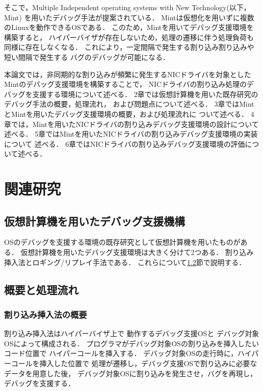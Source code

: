 \documentclass[tanilab-enum]{graduate}
\begin{document}
そこで，Multiple Independent operating systems with New Technology(以下，Mint)\cite{senzaki}
を用いたデバッグ手法が提案されている．
Mintは仮想化を用いずに複数のLinuxを動作できるOSである．
このため，Mintを用いてデバッグ支援環境を構築すると，
ハイパーバイザが存在しないため，処理の遷移に伴う処理負荷も
同様に存在しなくなる．
これにより，一定間隔で発生する割り込み割り込みや短い間隔で発生する
バグのデバッグが可能になる．

本論文では，非同期的な割り込みが頻繁に発生するNICドライバを対象とした
Mintのデバッグ支援環境を構築することで，
NICドライバの割り込み処理のデバッグを支援する環境について述べる．
2章では仮想計算機を用いた既存研究のデバッグ手法の概要，処理流れ，
および問題点について述べる．
3章ではMintとMintを用いたデバッグ支援環境の概要，および処理流れに
ついて述べる．
4章では，Mintを用いたNICドライバの割り込みデバッグ支援環境の設計について述べる．
5章ではMintを用いたNICドライバの割り込みデバッグ支援環境の実装について
述べる．
6章ではNICドライバの割り込みデバッグ支援環境の評価について述べる．
\chapter{関連研究}\label{chap:kanren}
\section{仮想計算機を用いたデバッグ支援機構}
OSのデバッグを支援する環境の既存研究として仮想計算機を用いたものがある．
仮想計算機を用いたデバッグ支援環境は大きく分けて2つある．
割り込み挿入法とロギング/リプレイ手法である．
これらについて\ref{kasougaiyou}節で説明する．
\section{概要と処理流れ}\label{kasougaiyou}
    \subsection{割り込み挿入法の概要}
    割り込み挿入法\cite{miyahara}はハイパーバイザ上で
    動作するデバッグ支援OSと
    デバッグ対象OSによって構成される．
    プログラマがデバッグ対象OSの割り込みを挿入したいコード位置で
    ハイパーコールを挿入する．
    デバッグ対象OSの走行時に，ハイパーコールを挿入した位置で
    処理が遷移し，デバッグ支援OSで割り込みに必要なデータを用意した後，
    デバッグ対象OSに割り込みを発生させ，バグを再現し，デバッグを支援する．
\end{document}
